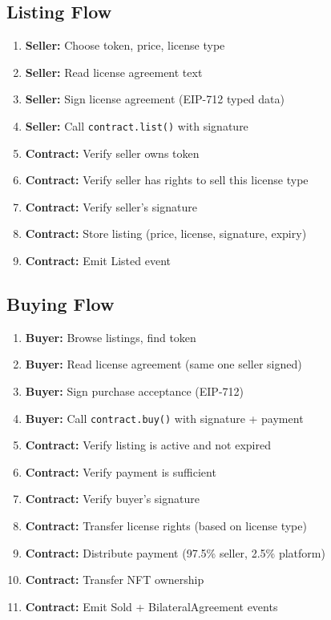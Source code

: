 \documentclass[11pt,a4paper]{article}
\newcommand{\code}[1]{\texttt{#1}}
\begin{document}
\subsection{Listing Flow}

\begin{enumerate}
    \item \textbf{Seller:} Choose token, price, license type
    \item \textbf{Seller:} Read license agreement text
    \item \textbf{Seller:} Sign license agreement (EIP-712 typed data)
    \item \textbf{Seller:} Call \code{contract.list()} with signature
    \item \textbf{Contract:} Verify seller owns token
    \item \textbf{Contract:} Verify seller has rights to sell this license type
    \item \textbf{Contract:} Verify seller's signature
    \item \textbf{Contract:} Store listing (price, license, signature, expiry)
    \item \textbf{Contract:} Emit Listed event
\end{enumerate}

\subsection{Buying Flow}

\begin{enumerate}
    \item \textbf{Buyer:} Browse listings, find token
    \item \textbf{Buyer:} Read license agreement (same one seller signed)
    \item \textbf{Buyer:} Sign purchase acceptance (EIP-712)
    \item \textbf{Buyer:} Call \code{contract.buy()} with signature + payment
    \item \textbf{Contract:} Verify listing is active and not expired
    \item \textbf{Contract:} Verify payment is sufficient
    \item \textbf{Contract:} Verify buyer's signature
    \item \textbf{Contract:} Transfer license rights (based on license type)
    \item \textbf{Contract:} Distribute payment (97.5\% seller, 2.5\% platform)
    \item \textbf{Contract:} Transfer NFT ownership
    \item \textbf{Contract:} Emit Sold + BilateralAgreement events
\end{enumerate}
\end{document}
